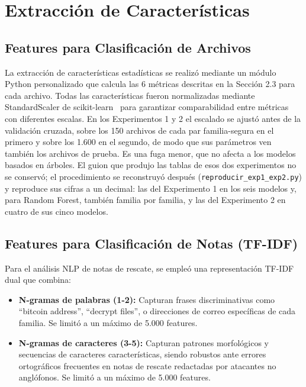 \section{Extracción de Características}

\subsection{Features para Clasificación de Archivos}

La extracción de características estadísticas se realizó mediante un módulo Python personalizado que calcula las 6 métricas descritas en la Sección 2.3 para cada archivo. Todas las características fueron normalizadas mediante StandardScaler de scikit-learn~\cite{sklearn} para garantizar comparabilidad entre métricas con diferentes escalas. En los Experimentos 1 y 2 el escalado se ajustó antes de la validación cruzada, sobre los 150 archivos de cada par familia-segura en el primero y sobre los 1.600 en el segundo, de modo que sus parámetros ven también los archivos de prueba. Es una fuga menor, que no afecta a los modelos basados en árboles. El guion que produjo las tablas de esos dos experimentos no se conservó; el procedimiento se reconstruyó después (\texttt{reproducir\_exp1\_exp2.py}) y reproduce sus cifras a un decimal: las del Experimento 1 en los seis modelos y, para Random Forest, también familia por familia, y las del Experimento 2 en cuatro de sus cinco modelos.

\subsection{Features para Clasificación de Notas (TF-IDF)}

Para el análisis NLP de notas de rescate, se empleó una representación TF-IDF dual que combina:

\begin{itemize}
    \item \textbf{N-gramas de palabras (1-2):} Capturan frases discriminativas como ``bitcoin address'', ``decrypt files'', o direcciones de correo específicas de cada familia. Se limitó a un máximo de 5.000 features.
    \item \textbf{N-gramas de caracteres (3-5):} Capturan patrones morfológicos y secuencias de caracteres características, siendo robustos ante errores ortográficos frecuentes en notas de rescate redactadas por atacantes no anglófonos. Se limitó a un máximo de 5.000 features.
\end{itemize}

